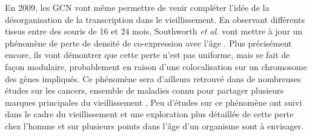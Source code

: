En 2009, les \acrshort{GCN} vont même permettre de venir compléter l'idée de la désorganisation de la transcription dans le vieillissement. En observant différents tissus entre des souris de 16 et 24 mois, Southworth \textit{et al.} vont mettre à jour un phénomène de perte de densité de co-expression avec l'âge \cite{Southworth2009}. Plus précisément encore, ils vont démontrer que cette perte n'est pas uniforme, mais se fait de façon modulaire, probablement en raison d'une colocalisation sur un chromosome des gènes impliqués. Ce phénomène sera d'ailleurs retrouvé dans de nombreuses études sur les cancers, ensemble de maladies connu pour partager plusieurs marques principales du vieillissement \cite{Anglani2014}. Peu d'études sur ce phénomène ont suivi dans le cadre du vieillissement et une exploration plus détaillée de cette perte chez l'homme et sur plusieurs points dans l'âge d'un organisme sont à envisager.






